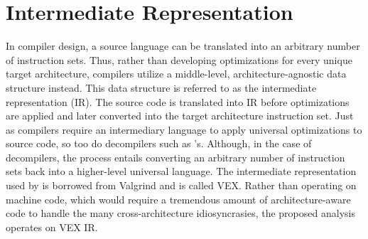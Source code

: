 \section{Intermediate Representation}
In compiler design, a source language can be translated into an arbitrary number of instruction sets. Thus, rather than developing optimizations for every unique target architecture, compilers utilize a middle-level, architecture-agnostic data structure instead. This data structure is referred to as the intermediate representation (IR). The source code is translated into IR before optimizations are applied and later converted into the target architecture instruction set. Just as compilers require an intermediary language to apply universal optimizations to source code, so too do decompilers such as ’s. Although, in the case of decompilers, the process entails converting an arbitrary number of instruction sets back into a higher-level universal language. The intermediate representation used by  is borrowed from Valgrind and is called VEX. Rather than operating on machine code, which would require a tremendous amount of architecture-aware code to handle the many cross-architecture idiosyncrasies, the proposed analysis operates on VEX IR.